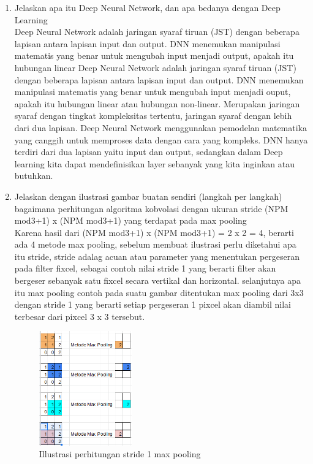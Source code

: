 \begin{enumerate}
\item Jelaskan apa itu Deep Neural Network, dan apa bedanya dengan Deep Learning\\
Deep Neural Network adalah jaringan syaraf tiruan (JST) dengan beberapa lapisan antara lapisan input dan output. DNN menemukan manipulasi matematis yang benar untuk mengubah input menjadi output, apakah itu hubungan linear
Deep Neural Network adalah jaringan syaraf tiruan (JST) dengan beberapa lapisan antara lapisan input dan output. DNN menemukan manipulasi matematis yang benar untuk mengubah input menjadi ouput, apakah itu hubungan linear atau hubungan non-linear. Merupakan jaringan syaraf dengan tingkat kompleksitas tertentu, jaringan syaraf dengan lebih dari dua lapisan. Deep Neural Network menggunakan pemodelan matematika yang canggih untuk memproses data dengan cara yang kompleks. DNN hanya terdiri dari dua lapisan yaitu input dan output, sedangkan dalam Deep learning kita dapat mendefinisikan layer sebanyak yang kita inginkan atau butuhkan.

\item Jelaskan dengan ilustrasi gambar buatan sendiri (langkah per langkah) bagaimana perhitungan algoritma kobvolasi dengan ukuran stride (NPM mod3+1) x (NPM mod3+1) yang terdapat pada max pooling\\
Karena hasil dari (NPM mod3+1) x (NPM mod3+1) = 2 x 2 = 4, berarti ada 4 metode max pooling, sebelum membuat ilustrasi perlu diketahui apa itu stride, stride adalag acuan atau parameter yang menentukan pergeseran pada filter fixcel, sebagai contoh nilai stride 1 yang berarti filter akan bergeser sebanyak satu fixcel secara vertikal dan horizontal. selanjutnya apa itu max pooling contoh pada suatu gambar ditentukan max pooling dari 3x3 dengan stride 1 yang berarti setiap pergeseran 1 pixcel akan diambil nilai terbesar dari pixcel 3 x 3 tersebut.
\begin{figure}[H]
		\includegraphics[width=4cm]{figures/1174054/7/10.png}
		\centering
		\caption{Illustrasi perhitungan stride 1 max pooling}
	\end{figure}

\end{enumerate}

